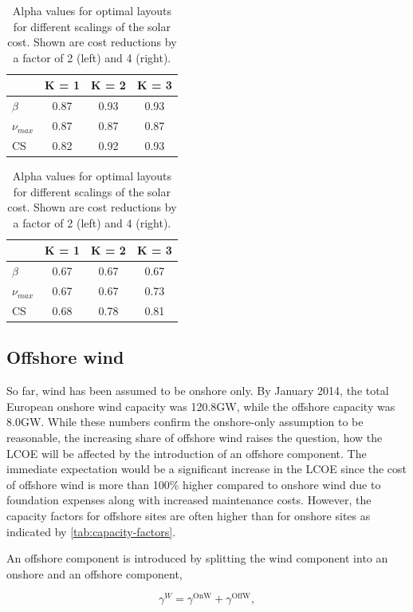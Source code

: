 \documentclass[a4paper, 12pt, sort&compress]{elsarticle}%
\begin{document}
\begin{table}[h!]
  \centering
  \caption{Alpha values for optimal layouts for different scalings of
    the solar cost. Shown are cost reductions by a factor of 2 (left)
    and 4 (right).}
  \label{tab:solar-alpha}
  \begin{tabular}[h!]{l c c c}\toprule
    & K = 1 & K = 2 & K = 3 \\ \midrule
    $\beta$ & 0.87 & 0.93 & 0.93 \\ 
    $\nu_{max}$ & 0.87 & 0.87 & 0.87 \\ 
    CS & 0.82 & 0.92 & 0.93 \\ \bottomrule
  \end{tabular}
  \hspace{30pt}
  \begin{tabular}[h!]{l c c c}\toprule
    & K = 1 & K = 2 & K = 3 \\ \midrule
    $\beta$ & 0.67 & 0.67 & 0.67 \\ 
    $\nu_{max}$ & 0.67 & 0.67 & 0.73 \\ 
    CS & 0.68 & 0.78 & 0.81 \\ \bottomrule

  \end{tabular}
\end{table}

\subsection{Offshore wind}
\label{sec:offshore-wind}

So far, wind has been assumed to be onshore only. By January
2014, the total European onshore wind capacity was 120.8GW, while the
offshore capacity was 8.0GW\cite{EWEA}. While these numbers confirm
the onshore-only assumption to be reasonable, the increasing share of
offshore wind raises the question, how the LCOE will be affected by
the introduction of an offshore component. The immediate expectation
would be a significant increase in the LCOE since the cost of offshore
wind is more than 100\% higher compared to onshore wind due to
foundation expenses along with increased maintenance costs. However,
the capacity factors for offshore sites are often higher than for
onshore sites as indicated by \cref{tab:capacity-factors}. 

An offshore component is introduced by splitting the wind component
into an onshore and an offshore component,

\begin{equation}
  \label{eq:11}
  \gamma^{W} = \gamma^{\text{OnW}} + \gamma^{\text{OffW}}, 
\end{equation}
\end{document}
